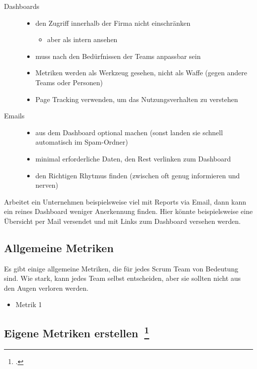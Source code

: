 \begin{description}
  \item[Dashboards] \hfill
  \begin{itemize}[noitemsep]
    \item den Zugriff innerhalb der Firma nicht einschränken
    \begin{itemize}[noitemsep]
      \item aber als intern ansehen
    \end{itemize}
    \item muss nach den Bedürfnissen der Teams anpassbar sein
    \item Metriken werden als Werkzeug gesehen, nicht als Waffe (gegen andere Teams oder Personen)
    \item Page Tracking verwenden, um das Nutzungsverhalten zu verstehen
  \end{itemize}
  \item[Emails] \hfill
  \begin{itemize}[noitemsep]
    \item aus dem Dashboard optional machen (sonst landen sie schnell automatisch im Spam-Ordner)
    \item minimal erforderliche Daten, den Rest verlinken zum Dashboard
    \item den Richtigen Rhytmus finden (zwischen oft genug informieren und nerven)
  \end{itemize}
\end{description}

Arbeitet ein Unternehmen beispielsweise viel mit Reports via Email, dann kann ein reines Dashboard weniger Anerkennung finden. Hier könnte beispielsweise eine Übersicht per Mail versendet und mit Links zum Dashboard versehen werden.

\subsection{Allgemeine Metriken}

Es gibt einige allgemeine Metriken, die für jedes Scrum Team von Bedeutung sind.
Wie stark, kann jedes Team selbst entscheiden, aber sie sollten nicht aus den Augen verloren werden.

\begin{itemize}
  \item Metrik 1
\end{itemize}

\subsection[Eigene Metriken erstellen]{Eigene Metriken erstellen~\footcite[vgl.][S.127ff]{davis_agile_2015}}

